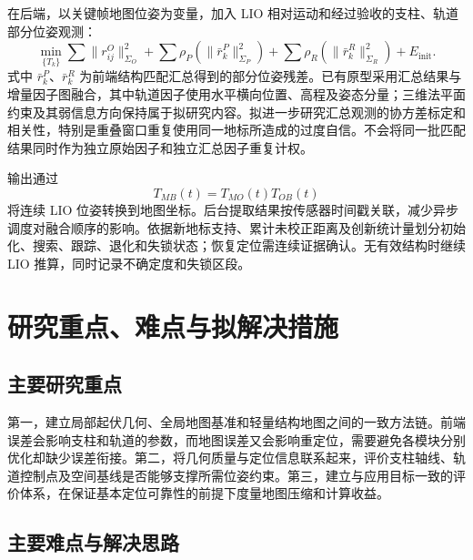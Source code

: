 \documentclass[UTF8,a4paper,12pt,fontset=fandol]{ctexart}
\begin{document}
在后端，以关键帧地图位姿为变量，加入 LIO 相对运动和经过验收的支柱、轨道部分位姿观测：
\begin{equation}
 \min_{\{T_k\}}
 \sum\|r_{ij}^{O}\|_{\Sigma_O}^2
 +\sum\rho_P(\|\bar r_k^{P}\|_{\Sigma_P}^2)
 +\sum\rho_R(\|\bar r_k^{R}\|_{\Sigma_R}^2)
 +E_{\mathrm{init}}.
 \label{eq:localization}
\end{equation}
式中 \(\bar r_k^{P}\)、\(\bar r_k^{R}\) 为前端结构匹配汇总得到的部分位姿残差。已有原型采用汇总结果与增量因子图融合，其中轨道因子使用水平横向位置、高程及姿态分量；三维法平面约束及其弱信息方向保持属于拟研究内容。拟进一步研究汇总观测的协方差标定和相关性，特别是重叠窗口重复使用同一地标所造成的过度自信。不会将同一批匹配结果同时作为独立原始因子和独立汇总因子重复计权。

输出通过
\begin{equation}
 T_{MB}(t)=T_{MO}(t)T_{OB}(t)
\end{equation}
将连续 LIO 位姿转换到地图坐标。后台提取结果按传感器时间戳关联，减少异步调度对融合顺序的影响。依据新地标支持、累计未校正距离及创新统计量划分初始化、搜索、跟踪、退化和失锁状态；恢复定位需连续证据确认。无有效结构时继续 LIO 推算，同时记录不确定度和失锁区段。

\section{研究重点、难点与拟解决措施}

\subsection{主要研究重点}

第一，建立局部起伏几何、全局地图基准和轻量结构地图之间的一致方法链。前端误差会影响支柱和轨道的参数，而地图误差又会影响重定位，需要避免各模块分别优化却缺少误差衔接。第二，将几何质量与定位信息联系起来，评价支柱轴线、轨道控制点及空间基线是否能够支撑所需位姿约束。第三，建立与应用目标一致的评价体系，在保证基本定位可靠性的前提下度量地图压缩和计算收益。

\subsection{主要难点与解决思路}
\end{document}
